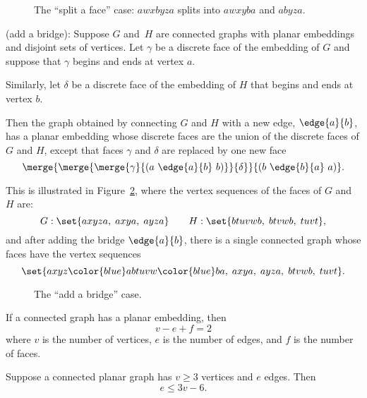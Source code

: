 \documentclass[handout]{mcs}
\begin{document}
\begin{definition*}
\begin{figure}


\caption{The ``split a face'' case: $awxbyza$ splits into $awxyba$ and $abyza$.}
\label{8ffig:face-splitting}
\end{figure}

 (add a bridge): Suppose $G$ and~$H$
are connected graphs with planar embeddings and disjoint sets of
vertices.  Let $\gamma$ be a discrete face of the embedding of $G$ and
suppose that $\gamma$ begins and ends at vertex $a$.
\iffalse
That is, $\gamma$ is of the form
\[
a\dots a.
\]
\fi

Similarly, let $\delta$ be a discrete face of the embedding of $H$
that begins and ends at vertex $b$.
\iffalse
So $\delta$ is of the form
\[
b\cdots b.
\]
\fi

Then the graph obtained by connecting $G$ and $H$ with a new edge,
$\edge{a}{b}$, has a planar embedding whose discrete faces are the union of
the discrete faces of $G$ and $H$, except that faces $\gamma$ and $\delta$
are replaced by one new face
\[
\merge{\merge{\merge{\gamma}{(a\ \edge{a}{b}\ b)}}{\delta}}{(b\ \edge{b}{a}\ a)}.
\]

This is illustrated in Figure~\ref{8ffig:add-bridge}, where the vertex
sequences of the faces of $G$ and $H$ are:
\[
G: \set{ axyza,\; axya,\; ayza }
    \qquad H: \set{ btuvwb,\; btvwb,\; tuvt },
\]
and after adding the bridge $\edge{a}{b}$, there is a
single connected graph whose faces have the vertex sequences
\[
\set{ axyz{\color{blue}ab}tuvw{\color{blue}ba},\;
         axya,\; ayza,\; btvwb,\; tuvt }.
\]

\begin{figure}


\caption{The ``add a bridge'' case.}
\label{8ffig:add-bridge}
\end{figure}

\end{definition*}

\begin{theorem}
If a connected graph has a planar embedding, then
%
\[
v - e + f = 2
\]
%
where $v$ is the number of vertices, $e$ is the number of edges, and
$f$ is the number of faces.
\end{theorem}

\begin{corollary}
\label{cp8f.3v}
Suppose a connected planar graph has $v \geq 3$ vertices and $e$ edges.  Then
\[
e \leq 3v-6.
\]
\end{corollary}
\end{document}
